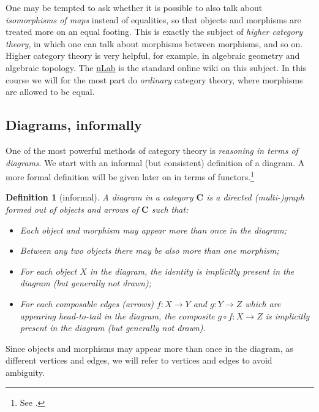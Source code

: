 \documentclass[a4paper,11pt,oneside]{scrbook}
\numberwithin{equation}{section}
\theoremstyle{plain}
\newtheorem{deph}[thm]{Definition}
\theoremstyle{definition}
\newcommand{\cat}[1]{{\mathbf{#1}}} %
\DeclareMathOperator{\1}{\mathbbm{1}}
\DeclareMathOperator{\2}{\mathbbm{2}}
\begin{document}
One may be tempted to ask whether it is possible to also talk about \emph{isomorphisms of maps} instead of equalities, so that objects and morphisms are treated more on an equal footing. This is exactly the subject of \emph{higher category theory}, in which one can talk about morphisms between morphisms, and so on. Higher category theory is very helpful, for example, in algebraic geometry and algebraic topology. The \href{http://ncatlab.org}{nLab} is the standard online wiki on this subject. 
In this course we will for the most part do \emph{ordinary} category theory, where morphisms are allowed to be equal. 


\subsection{Diagrams, informally}\label{infdiagrams}

One of the most powerful methods of category theory is \emph{reasoning in terms of diagrams}. 
We start with an informal (but consistent) definition of a diagram. A more formal definition will be given later on in terms of functors.\footnote{See .}

\begin{deph}[informal]
 A \emph{diagram} in a category $\cat{C}$ is a directed (multi-)graph formed out of objects and arrows of $\cat{C}$ such that:
 \begin{itemize}
  \item Each object and morphism may appear more than once in the diagram;
  \item Between any two objects there may be also more than one morphism;
  \item For each object $X$ in the diagram, the identity is implicitly present in the diagram (but generally not drawn);
  \item For each composable edges (arrows) $f:X\to Y$ and $g:Y\to Z$ which are appearing head-to-tail in the diagram, the composite $g\circ f:X\to Z$ is implicitly present in the diagram (but generally not drawn).
 \end{itemize}
\end{deph}

Since objects and morphisms may appear more than once in the diagram, as different vertices and edges, we will refer to vertices and edges to avoid ambiguity. 
\end{document}
